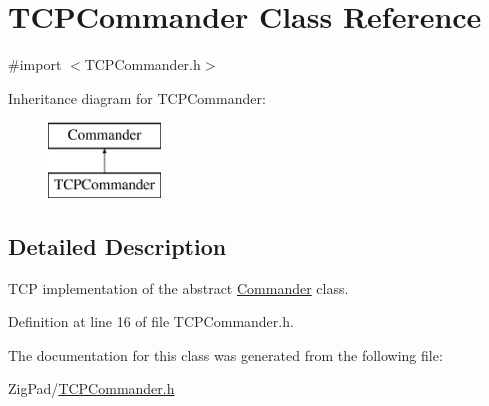 \hypertarget{interface_t_c_p_commander}{
\section{TCPCommander Class Reference}
\label{interface_t_c_p_commander}
}


{\ttfamily \#import $<$TCPCommander.h$>$}

Inheritance diagram for TCPCommander:\begin{figure}[H]
\begin{center}
\leavevmode
\includegraphics[height=2.000000cm]{interface_t_c_p_commander}
\end{center}
\end{figure}


\subsection{Detailed Description}
TCP implementation of the abstract \hyperlink{interface_commander}{Commander} class. 

Definition at line 16 of file TCPCommander.h.



The documentation for this class was generated from the following file:\begin{DoxyCompactItemize}
\item 
ZigPad/\hyperlink{_t_c_p_commander_8h}{TCPCommander.h}\end{DoxyCompactItemize}
